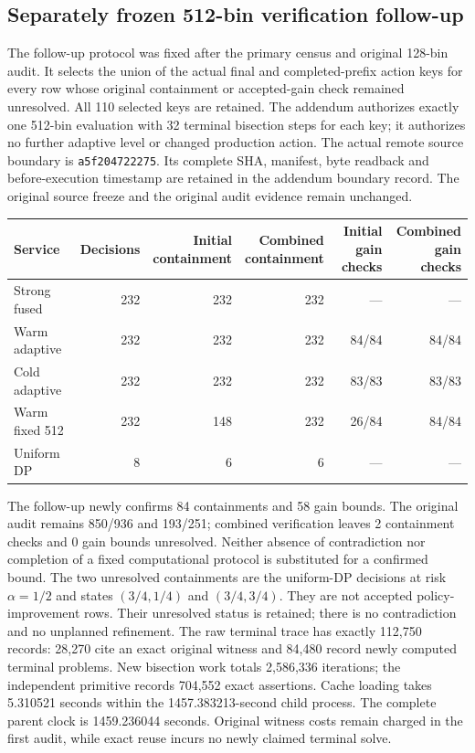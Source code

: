 \subsection{Separately frozen 512-bin verification follow-up}
\label{dev:followupaudit125}
The follow-up protocol was fixed after the primary census and original 128-bin audit. It selects the union of the actual final and completed-prefix action keys for every row whose original containment or accepted-gain check remained unresolved. All 110 selected keys are retained. The addendum authorizes exactly one 512-bin evaluation with 32 terminal bisection steps for each key; it authorizes no further adaptive level or changed production action.
The actual remote source boundary is \texttt{a5f204722275}. Its complete SHA, manifest, byte readback and before-execution timestamp are retained in the addendum boundary record. The original source freeze and the original audit evidence remain unchanged.
\begin{center}\small
\begin{tabular}{lrrrrr}
\hline
Service & Decisions & \shortstack{Initial\\containment} & \shortstack{Combined\\containment} & \shortstack{Initial\\gain checks} & \shortstack{Combined\\gain checks} \\
\hline
Strong fused & 232 & 232 & 232 & --- & --- \\
Warm adaptive & 232 & 232 & 232 & 84/84 & 84/84 \\
Cold adaptive & 232 & 232 & 232 & 83/83 & 83/83 \\
Warm fixed 512 & 232 & 148 & 232 & 26/84 & 84/84 \\
Uniform DP & 8 & 6 & 6 & --- & --- \\
\hline\end{tabular}
\end{center}
The follow-up newly confirms 84 containments and 58 gain bounds. The original audit remains 850/936 and 193/251; combined verification leaves 2 containment checks and 0 gain bounds unresolved. Neither absence of contradiction nor completion of a fixed computational protocol is substituted for a confirmed bound.
The two unresolved containments are the uniform-DP decisions at risk $\alpha=1/2$ and states $(3/4,1/4)$ and $(3/4,3/4)$. They are not accepted policy-improvement rows. Their unresolved status is retained; there is no contradiction and no unplanned refinement.
The raw terminal trace has exactly 112,750 records: 28,270 cite an exact original witness and 84,480 record newly computed terminal problems. New bisection work totals 2,586,336 iterations; the independent primitive records 704,552 exact assertions. Cache loading takes 5.310521 seconds within the 1457.383213-second child process. The complete parent clock is 1459.236044 seconds. Original witness costs remain charged in the first audit, while exact reuse incurs no newly claimed terminal solve.
